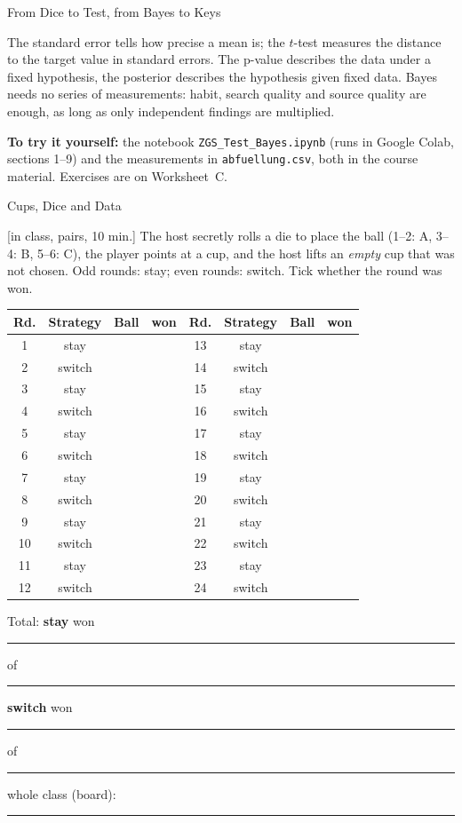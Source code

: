 \begin{handout}{From Dice to Test, from Bayes to Keys}
\begin{merkbox}
The standard error tells how precise a mean is; the $t$-test measures
the distance to the target value in standard errors. The p-value
describes the data under a fixed hypothesis, the posterior describes the
hypothesis given fixed data. Bayes needs no series of measurements:
habit, search quality and source quality are enough, as long as only
independent findings are multiplied.
\end{merkbox}

\textbf{To try it yourself:} the notebook \texttt{ZGS\_Test\_Bayes.ipynb}
(runs in Google Colab, sections 1--9) and the measurements in
\texttt{abfuellung.csv}, both in the course material. Exercises are on
Worksheet~C.
\end{handout}

\begin{uebungsblatt}{Cups, Dice and Data}

[in class, pairs, 10 min.]
The host secretly rolls a die to place the ball (1--2: A, 3--4: B,
5--6: C), the player points at a cup, and the host lifts an \emph{empty}
cup that was not chosen. Odd rounds: stay; even rounds: switch. Tick
whether the round was won.

\begin{center}
\small
\renewcommand{\arraystretch}{1.25}
\begin{tabular}{|c|c|c|c||c|c|c|c|}
\hline
\textbf{Rd.} & \textbf{Strategy} & \textbf{Ball} & \textbf{won} &
\textbf{Rd.} & \textbf{Strategy} & \textbf{Ball} & \textbf{won} \\ \hline
1 & stay & & & 13 & stay & & \\ \hline
2 & switch & & & 14 & switch & & \\ \hline
3 & stay & & & 15 & stay & & \\ \hline
4 & switch & & & 16 & switch & & \\ \hline
5 & stay & & & 17 & stay & & \\ \hline
6 & switch & & & 18 & switch & & \\ \hline
7 & stay & & & 19 & stay & & \\ \hline
8 & switch & & & 20 & switch & & \\ \hline
9 & stay & & & 21 & stay & & \\ \hline
10 & switch & & & 22 & switch & & \\ \hline
11 & stay & & & 23 & stay & & \\ \hline
12 & switch & & & 24 & switch & & \\ \hline
\end{tabular}
\end{center}
Total: \textbf{stay} won \rule{12mm}{0.3pt} of \rule{12mm}{0.3pt}
\qquad \textbf{switch} won \rule{12mm}{0.3pt} of \rule{12mm}{0.3pt}
\qquad whole class (board): \rule{25mm}{0.3pt}


\end{uebungsblatt}
